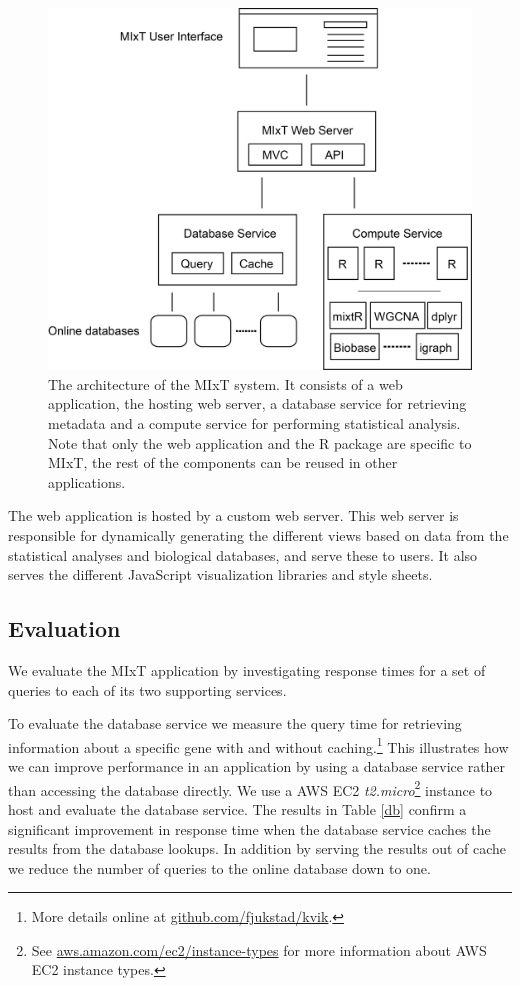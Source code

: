 \begin{figure}[h!]
\centering
\includegraphics[scale=0.4]{figures/mixt-architecture.png}
    \caption[The architecture of the MIxT system.]{The architecture of the MIxT
    system. It consists of a web application, the hosting web server, a database
    service for retrieving metadata and a compute service for performing
    statistical analysis. Note that only the web application and the R package
    are specific to MIxT, the rest of the components can be reused in other
    applications.} 
\label{kvik-mixt}
\end{figure} 

The web application is hosted by a custom web server. This web server is
responsible for dynamically generating the different views based on data from
the statistical analyses and biological databases, and serve these to users. It
also serves the different JavaScript visualization libraries and style sheets. 

\subsection{Evaluation} 
We evaluate the MIxT application by investigating response times for a set of
queries to each of its two supporting services. 

To evaluate the database service we measure the query time for retrieving
information about a specific gene with and without caching.\footnote{More
details online at \url{github.com/fjukstad/kvik}.} This
illustrates how we can improve performance in an application by using a database
service rather than accessing the database directly. 
We use a AWS EC2 \emph{t2.micro}\footnote{See
\url{aws.amazon.com/ec2/instance-types} for more information about AWS EC2
instance types.} instance to host and evaluate the database service.  The
results in Table \ref{db} confirm a significant improvement in response time
when the database service caches the results from the database lookups. In
addition by serving the results out of cache we reduce the number of queries to
the online database down to one. 

